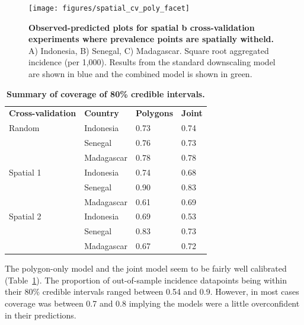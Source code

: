 \documentclass[10pt,letterpaper]{article}
\newlength\savedwidth
\newcommand\thickhline{\noalign{\global\savedwidth\arrayrulewidth\global\arrayrulewidth 2pt}%
\hline
\noalign{\global\arrayrulewidth\savedwidth}}
\begin{document}
\begin{figure}
\texttt{[image: figures/spatial\_cv\_poly\_facet]} 
\caption{{\bf Observed-predicted plots for spatial b cross-validation experiments where prevalence points are spatially witheld.}
A) Indonesia, B) Senegal, C) Madagascar. Square root aggregated incidence (per 1,000).
Results from the standard downscaling model are shown in blue and the combined model is shown in green.
}
\label{spatialpredobspolyfacet}
\end{figure}


\begin{table}[t]
\begin{adjustwidth}{-2.25in}{0in} %
\centering
\caption{
{\bf Summary of coverage of 80\% credible intervals.}}
\begin{tabular}{llll}
\hline
{\bf Cross-validation} & {\bf Country}  & {\bf Polygons} & {\bf Joint} \\
\thickhline 
Random & Indonesia  & 0.73 &  0.74\\
& Senegal  & 0.76 &  0.73\\
& Madagascar  & 0.78 &  0.78\vspace{1mm}\\
 Spatial 1 & Indonesia & 0.74 &  0.68\\
& Senegal  & 0.90 &  0.83\\
& Madagascar  & 0.61 &  0.69\vspace{1mm} \\
 Spatial 2 & Indonesia  & 0.69 &  0.53\\
& Senegal  & 0.83 &  0.73\\
& Madagascar  & 0.67 &  0.72\\


\end{tabular}
\begin{flushleft}

\end{flushleft}
\label{table3}
\end{adjustwidth}
\end{table}





The polygon-only model and the joint model seem to be fairly well calibrated (Table~\ref{table3}).
The proportion of out-of-sample incidence datapoints being within their 80\% credible intervals ranged between 0.54 and 0.9.
However, in most cases coverage was between 0.7 and 0.8 implying the models were a little overconfident in their predictions.
\end{document}
